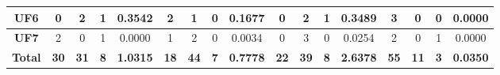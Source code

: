 \begin{table*}[t]
{\begin{tabular}{c|c|c|c|c|c|c|c|c|c|c|c|c|c|c|c|c|}
\multicolumn{1}{|c|}{\textbf{UF6}}   & 0                   & 2                     & 1                          & 0.3542          & 2                   & 1                     & 0                          & 0.1677          & 0                   & 2                     & 1                          & 0.3489          & 3                   & 0                     & 0                          & 0.0000          \\ \hline
\multicolumn{1}{|c|}{\textbf{UF7}}   & 2                   & 0                     & 1                          & 0.0000          & 1                   & 2                     & 0                          & 0.0034          & 0                   & 3                     & 0                          & 0.0254          & 2                   & 0                     & 1                          & 0.0000          \\ \hline
\multicolumn{1}{|c|}{\textbf{Total}} & \textbf{30}         & \textbf{31}           & \textbf{8}                 & \textbf{1.0315} & \textbf{18}         & \textbf{44}           & \textbf{7}                 & \textbf{0.7778} & \textbf{22}         & \textbf{39}           & \textbf{8}                 & \textbf{2.6378} & \textbf{55}         & \textbf{11}           & \textbf{3}                 & \textbf{0.0350} \\ \hline
\end{tabular}%
}
\end{table*}
